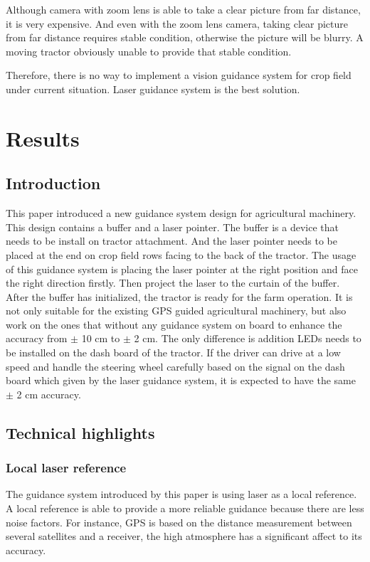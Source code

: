 \documentclass[letterpaper,12pt,oneside]{book}
\begin{document}
		Although camera with zoom lens is able to take a clear picture from far distance, it is very expensive. And even with the zoom lens camera, taking clear picture from far distance requires stable condition, otherwise the picture will be blurry. A moving tractor obviously unable to provide that stable condition.
			
		\bigskip
		Therefore, there is no way to implement a vision guidance system for crop field under current situation. Laser guidance system is the best solution.
		
		\chapter{Results}
		
		\section{Introduction}
		This paper introduced a new guidance system design for agricultural machinery. This design contains a buffer and a laser pointer. The buffer is a device that needs to be install on tractor attachment. And the laser pointer needs to be placed at the end on crop field rows facing to the back of the tractor. The usage of this guidance system is placing the laser pointer at the right position and face the right direction firstly. Then project the laser to the curtain of the buffer. After the buffer has initialized, the tractor is ready for the farm operation. It is not only suitable for the existing GPS guided agricultural machinery, but also work on the ones that without any guidance system on board to enhance the accuracy from $\pm$ 10 cm to $\pm$ 2 cm. The only difference is addition LEDs needs to be installed on the dash board of the tractor. If the driver can drive at a low speed and handle the steering wheel carefully based on the signal on the dash board which given by the laser guidance system, it is expected to have the same $\pm$ 2 cm accuracy. 
		
		
		\section{Technical highlights}
		
		\subsection{Local laser reference}
		The guidance system introduced by this paper is using laser as a local reference. A local reference is able to provide a more reliable guidance because there are less noise factors. For instance, GPS is based on the distance measurement between several satellites and a receiver, the high atmosphere has a significant affect to its accuracy. 
		
\end{document}
